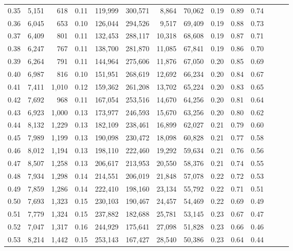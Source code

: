 \begin{tabular}{rrrrrrrrrrrrrr}
0.35 &  5,151 &    618 &  0.11 &  119,999 &  300,571 &   8,864 &  70,062 &  0.19 &  0.89 &      0.74 \\
0.36 &  6,045 &    653 &  0.10 &  126,044 &  294,526 &   9,517 &  69,409 &  0.19 &  0.88 &      0.73 \\
0.37 &  6,409 &    801 &  0.11 &  132,453 &  288,117 &  10,318 &  68,608 &  0.19 &  0.87 &      0.71 \\
0.38 &  6,247 &    767 &  0.11 &  138,700 &  281,870 &  11,085 &  67,841 &  0.19 &  0.86 &      0.70 \\
0.39 &  6,264 &    791 &  0.11 &  144,964 &  275,606 &  11,876 &  67,050 &  0.20 &  0.85 &      0.69 \\
0.40 &  6,987 &    816 &  0.10 &  151,951 &  268,619 &  12,692 &  66,234 &  0.20 &  0.84 &      0.67 \\
0.41 &  7,411 &  1,010 &  0.12 &  159,362 &  261,208 &  13,702 &  65,224 &  0.20 &  0.83 &      0.65 \\
0.42 &  7,692 &    968 &  0.11 &  167,054 &  253,516 &  14,670 &  64,256 &  0.20 &  0.81 &      0.64 \\
0.43 &  6,923 &  1,000 &  0.13 &  173,977 &  246,593 &  15,670 &  63,256 &  0.20 &  0.80 &      0.62 \\
0.44 &  8,132 &  1,229 &  0.13 &  182,109 &  238,461 &  16,899 &  62,027 &  0.21 &  0.79 &      0.60 \\
0.45 &  7,989 &  1,199 &  0.13 &  190,098 &  230,472 &  18,098 &  60,828 &  0.21 &  0.77 &      0.58 \\
0.46 &  8,012 &  1,194 &  0.13 &  198,110 &  222,460 &  19,292 &  59,634 &  0.21 &  0.76 &      0.56 \\
0.47 &  8,507 &  1,258 &  0.13 &  206,617 &  213,953 &  20,550 &  58,376 &  0.21 &  0.74 &      0.55 \\
0.48 &  7,934 &  1,298 &  0.14 &  214,551 &  206,019 &  21,848 &  57,078 &  0.22 &  0.72 &      0.53 \\
0.49 &  7,859 &  1,286 &  0.14 &  222,410 &  198,160 &  23,134 &  55,792 &  0.22 &  0.71 &      0.51 \\
0.50 &  7,693 &  1,323 &  0.15 &  230,103 &  190,467 &  24,457 &  54,469 &  0.22 &  0.69 &      0.49 \\
0.51 &  7,779 &  1,324 &  0.15 &  237,882 &  182,688 &  25,781 &  53,145 &  0.23 &  0.67 &      0.47 \\
0.52 &  7,047 &  1,317 &  0.16 &  244,929 &  175,641 &  27,098 &  51,828 &  0.23 &  0.66 &      0.46 \\
0.53 &  8,214 &  1,442 &  0.15 &  253,143 &  167,427 &  28,540 &  50,386 &  0.23 &  0.64 &      0.44 \\

\end{tabular}

